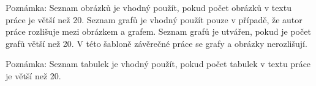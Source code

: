 \documentclass[11pt,a4paper]{report}
\let\openright=\clearpage
\begin{document}


\setcounter{tocdepth}{2}
\tableofcontents

\openright
\listoffigures
Poznámka: Seznam obrázků je vhodný použít, pokud počet obrázků v textu práce je větší než 20. Seznam grafů je vhodný použít pouze v případě, že autor práce rozlišuje mezi obrázkem a grafem. Seznam grafů je utvářen, pokud je počet grafů větší než 20. V této šabloně závěrečné práce se grafy a obrázky nerozlišují.

\clearpage
\listoftables
Poznámka: Seznam tabulek je vhodný použít, pokud počet tabulek v textu práce je větší než 20.



\pagestyle{fancyx}
{%
\pagestyle{plain}

}




% 
% 
{%
\pagestyle{plain}

}



\part*{\Prilohy\thispagestyle{empty}}
\appendix


% 
% 
\end{document}
